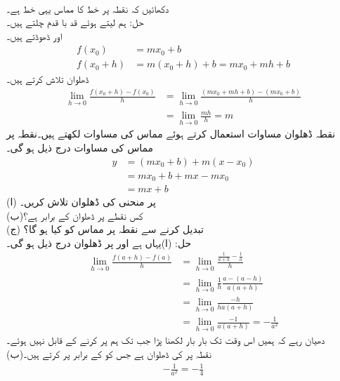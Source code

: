 \\
دکھائیں کہ نقطہ  پر خط  کا مماس یہی خط ہے۔\\
حل:\quad
ہم  لیتے ہوئے قد با قدم چلتے ہیں۔\\
\quad {} اور  ڈھوڈتے ہیں۔
\begin{align*}
f(x_0)&=mx_0+b\\
f(x_0+h)&=m(x_0+h)+b=mx_0+mh+b
\end{align*}
\quad
ڈھلوان تلاش کرتے ہیں۔
\begin{align*}
\lim_{h\to 0}\frac{f(x_0+h)-f(x_0)}{h}&=\lim_{h\to 0}\frac{(mx_0+mh+b)-(mx_0+b)}{h}\\
&=\lim_{h\to 0}\frac{mh}{h}=m
\end{align*}
\quad
نقطہ ڈھلوان مساوات استعمال کرتے ہوئے مماس کی مساوات لکھتے ہیں۔نقطہ   پر مماس کی مساوات درج ذیل ہو گی۔
\begin{align*}
y&=(mx_0+b)+m(x-x_0)\\
&=mx_0+b+mx-mx_0\\
&=mx+b
\end{align*}
(ا)\quad {} پر منحنی  کی ڈھلوان تلاش کریں۔\\
(ب)\quad کس نقطے پر ڈھلوان  کے برابر ہے؟\\
(ج)\quad {} تبدیل کرنے سے نقطہ  پر مماس کو کیا ہو گا؟\\
حل:\quad
(ا)\quad یہاں  ہے اور  پر ڈھلوان درج ذیل ہو گی۔
\begin{align*}
\lim_{h\to 0}\frac{f(a+h)-f(a)}{h}&=\lim_{h\to 0}\frac{\tfrac{1}{a+h}-\tfrac{1}{a}}{h}\\
&=\lim_{h\to 0} \frac{1}{h}\frac{a-(a-h)}{a(a+h)}\\
&=\lim_{h\to 0}\frac{-h}{ha(a+h)}\\
&=\lim_{h\to 0}\frac{-1}{a(a+h)}=-\frac{1}{a^2}
\end{align*}
دھیان رہے کہ ہمیں اس وقت تک  بار بار  لکھنا پڑا جب تک ہم   پر کرنے کے قابل نہیں ہوئے۔\\
(ب)\quad نقطہ  پر  کی ڈھلوان  ہے جس کو  کے برابر پر کرتے ہیں۔
\begin{align*}
-\tfrac{1}{a^2}=-\tfrac{1}{4}
\end{align*}
